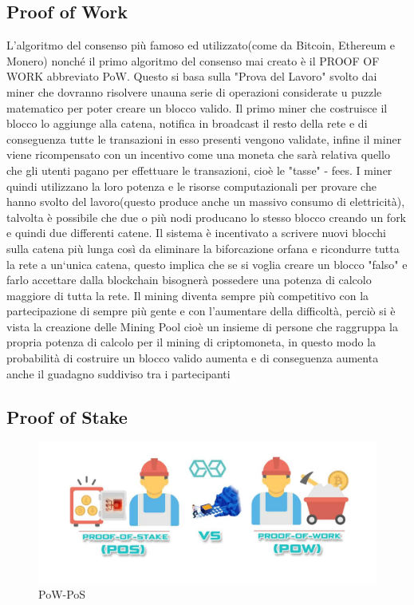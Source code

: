 \documentclass[12pt]{report}
\begin{document}
\subsection{Proof of Work}
L'algoritmo del consenso più famoso ed utilizzato(come da Bitcoin, Ethereum e Monero) nonché il primo algoritmo del consenso mai creato è il PROOF OF WORK abbreviato PoW. Questo si basa sulla "Prova del Lavoro" svolto dai miner che dovranno risolvere unauna serie di operazioni considerate u puzzle matematico per poter creare un blocco valido. Il primo miner che costruisce il blocco lo aggiunge alla catena, notifica in broadcast il resto della rete e di conseguenza tutte le transazioni in esso presenti vengono validate, infine il miner viene ricompensato con un incentivo come una moneta che sarà relativa quello che gli utenti pagano per effettuare le transazioni, cioè le "tasse" - fees. I miner quindi utilizzano la loro potenza e le risorse computazionali per provare che hanno svolto del lavoro(questo produce anche un massivo consumo di elettricità), talvolta è possibile che due o più nodi producano lo stesso blocco creando un fork e quindi due differenti catene. Il sistema è incentivato a scrivere nuovi blocchi sulla catena più lunga così da eliminare la biforcazione orfana e ricondurre tutta la rete a un`unica catena, questo implica che se si voglia creare un blocco "falso" e farlo accettare dalla blockchain bisognerà possedere una potenza di calcolo maggiore di tutta la rete. Il mining diventa sempre più competitivo con la partecipazione di sempre più gente e con l'aumentare della difficoltà, perciò si è vista la creazione delle Mining Pool cioè un insieme di persone che raggruppa la propria potenza di calcolo per il mining di criptomoneta, in questo modo la probabilità di costruire un blocco valido aumenta e di conseguenza aumenta anche il guadagno suddiviso tra i partecipanti

\subsection{Proof of Stake}
\begin{figure}[h]
	\includegraphics[width=\textwidth]{pow-pos}
	\centering
	\caption{PoW-PoS}
	\label{fig:pow-pos}
\end{figure}
\end{document}
